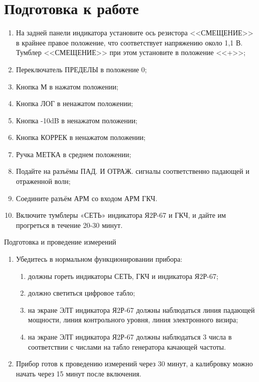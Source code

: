 \documentclass[a4paper]{article}
\begin{document}
    \section{Подготовка к работе}
        \begin{enumerate}
            \item На задней панели индикатора установите ось резистора
                <<СМЕЩЕНИЕ>> в крайнее правое положение, что соответствует
                напряжению около 1,1 В. Тумблер <<СМЕЩЕНИЕ>> при этом
                установите в положение <<+>>;
            \item Переключатель ПРЕДЕЛЫ в положение 0;
            \item Кнопка М в нажатом положении;
            \item Кнопка ЛОГ в ненажатом положении;
            \item Кнопка -10dB в ненажатом положении;
            \item Кнопка КОРРЕК в ненажатом положении;
            \item Ручка МЕТКА в среднем положении;
            \item Подайте на разъёмы ПАД. И ОТРАЖ. сигналы соответственно
                падающей и отраженной волн;
            \item Соедините разъём АРМ со входом АРМ ГКЧ.
            \item Включите тумблеры «СЕТЬ» индикатора Я2Р-67 и ГКЧ, и дайте им
                прогреться в течение 20-30 минут.
        \end{enumerate}

        Подготовка и проведение измерений
        \begin{enumerate}
            \item Убедитесь в нормальном функционировании прибора:
                \begin{enumerate}
                    \item должны гореть индикаторы СЕТЬ, ГКЧ и индикатора Я2Р-67;
                    \item должно светиться цифровое табло;
                    \item на экране ЭЛТ индикатора Я2Р-67 должны наблюдаться
                        линия падающей мощности, линия контрольного уровня,
                        линия электронного визира;
                    \item на экране ЭЛТ индикатора Я2Р-67 должны наблюдаться
                        3 числа в соответствии с числами на табло генератора
                        качающей частоты.
                \end{enumerate}
            \item Прибор готов к проведению измерений через 30 минут,
                а калибровку можно начать через 15 минут после включения.
        \end{enumerate}
\end{document}
